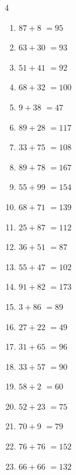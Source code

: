 \begin{multicols}{4}
\begin{enumerate}
  \item $87+8$
        $=95$

\columnbreak %

  \item $63+30$
        $=93$

  \item $51+41$
        $=92$

  \item $68+32$
        $=100$

  \item $9+38$
        $=47$

  \item $89+28$
        $=117$

  \item $33+75$
        $=108$

  \item $89+78$
        $=167$

  \item $55+99$
        $=154$

  \item $68+71$
        $=139$

  \item $25+87$
        $=112$

  \item $36+51$
        $=87$

  \item $55+47$
        $=102$

  \item $91+82$
        $=173$

  \item $3+86$
        $=89$

  \item $27+22$
        $=49$

  \item $31+65$
        $=96$

  \item $33+57$
        $=90$

  \item $58+2$
        $=60$

  \item $52+23$
        $=75$

  \item $70+9$
        $=79$

  \item $76+76$
        $=152$

  \item $66+66$
        $=132$


\end{enumerate}
\end{multicols}
